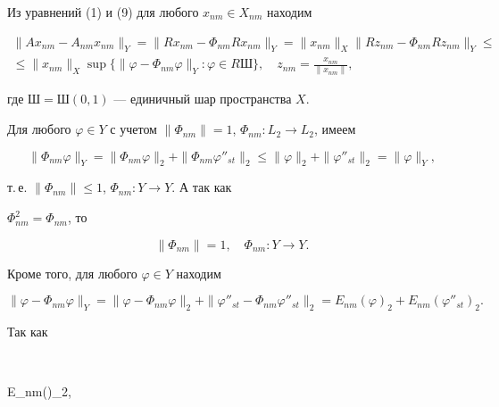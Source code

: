  


Из уравнений (1) и (9) для любого $x_{nm}\in X_{nm}$ находим 


\begin{multline} 


\|Ax_{nm}-A_{nm}x_{nm}\|_Y=\|R x_{nm}-\Phi_{nm}R x_{nm}\|_Y= 


\|x_{nm}\|_X\|R z_{nm}-\Phi_{nm}R z_{nm}\|_Y\le \\ 


% 


\le\|x_{nm}\|_X\sup\{\|\varphi-\Phi_{nm}\varphi\|_Y: 


\varphi\in R\text{Ш}\},\quad z_{nm}=\frac{x_{nm}}{\|x_{nm}\|}, 


\end{multline} 


где $\text{Ш}=\text{Ш}(0,1)$ --- единичный шар пространства $X$. 


 


Для любого $\varphi\in Y$ с учетом $\|\Phi_{nm}\|=1$, $\Phi_{nm}:L_2\to 


L_2$, имеем 


$$ 


\|\Phi_{nm}\varphi\|_Y=\|\Phi_{nm}\varphi\|_2+ 


\|\Phi_{nm}\varphi''_{st}\|_2\le\|\varphi\|_2+ 


\|\varphi''_{st}\|_2=\|\varphi\|_Y, 


$$ 


т.\,е. $\|\Phi_{nm}\|\le1$, $\Phi_{nm}:Y\to Y$. А так как 


$\Phi^2_{nm}=\Phi_{nm}$, то 


$$ 


\|\Phi_{nm}\|=1,\quad \Phi_{nm}:Y\to Y. 


$$ 


Кроме того, для любого $\varphi\in Y$ находим 


\begin{equation} 


\|\varphi-\Phi_{nm}\varphi\|_Y=\|\varphi-\Phi_{nm}\varphi\|_2+ 


\|\varphi''_{st}-\Phi_{nm}\varphi''_{st}\|_2= 


E_{nm}(\varphi)_2+E_{nm}(\varphi''_{st})_2. 


\end{equation} 


Так как 


$$ 


E_{nm}(\varphi)_2\le{}, 


